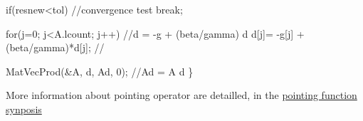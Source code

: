\begin{DoxyCode}
      \textcolor{keywordflow}{if}(resnew<tol)                       \textcolor{comment}{//convergence test}
         \textcolor{keywordflow}{break};
       
      \textcolor{keywordflow}{for}(j=0; j<A.lcount; j++)           \textcolor{comment}{//d = -g + (beta/gamma) d}
        d[j]= -g[j] + (beta/gamma)*d[j];  \textcolor{comment}{// }
   
      MatVecProd(&A, d, Ad, 0);           \textcolor{comment}{//Ad = A d}
    \}
\end{DoxyCode}


More information about pointing operator are detailled, in the \hyperlink{mapmat_8c}{pointing function synposis }

\par
 